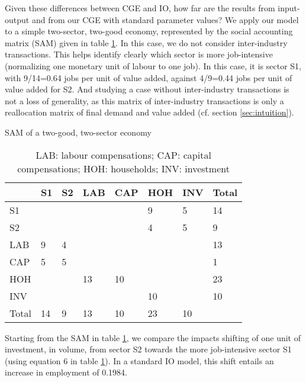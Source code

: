 Given these differences between CGE and IO, how far are the results from input-output and from our CGE with standard parameter values? 
We apply our model to a simple two-sector, two-good economy, represented by the social accounting matrix (SAM) given in table \ref{tab:SAM_2x2}. 
In this case, we do not consider inter-industry transactions. This helps identify clearly which sector is more job-intensive (normalizing one monetary unit of labour to one job). In this case, it is sector S1, with 9/14=0.64 jobs per unit of value added, against 4/9=0.44 jobs per unit of value added for S2. And studying a case without inter-industry transactions is not a loss of generality, as this matrix of inter-industry transactions is only a reallocation matrix of final demand and value added (cf. section \ref{sec:intuition}).

\begin{table}
	\centering
	\caption{SAM of a two-good, two-sector economy}
	\label{tab:SAM_2x2}
	\begin{tabular}{llllllll}
		\toprule
		& S1 & S2 & LAB & CAP & HOH & INV & Total \\
		\midrule
		S1 &  &  &  &  & 9 & 5 & 14 \\
		S2 &  &  &  &  & 4 & 5 & 9 \\
		LAB & 9 & 4 &  &  &  &  & 13 \\
		CAP & 5 & 5 &  &  &  &  & 1 \\
		HOH &  &  & 13 & 10 &  &  & 23 \\
		INV &  &  &  &  & 10 &  & 10 \\
		Total & 14 & 9 & 13 & 10 & 23 & 10 &  \\
		\bottomrule
	\end{tabular}
	\caption*{LAB: labour compensations; CAP: capital compensations; HOH: households; INV: investment}
\end{table}

Starting from the SAM in table \ref{tab:SAM_2x2}, we compare the impacts shifting of one unit of investment, in volume, from sector S2 towards the more job-intensive sector S1 (using equation 6 in table \ref{tab:SAM_2x2}). 
In a standard IO model, this shift entails an increase in employment of 0.1984.

